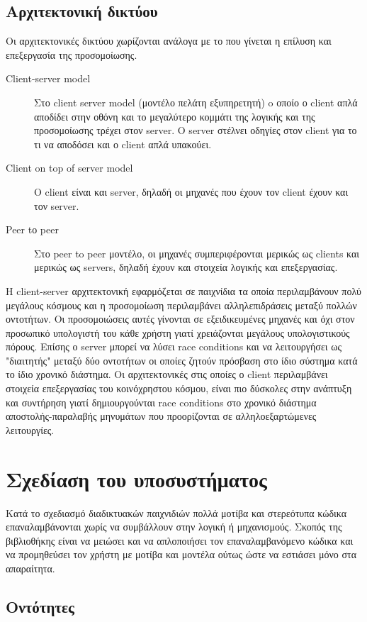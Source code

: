 		\subsection{Αρχιτεκτονική δικτύου}
			Οι αρχιτεκτονικές δικτύου χωρίζονται ανάλογα με το που γίνεται η επίλυση και επεξεργασία της προσομοίωσης.  
		\begin{description}	
			\item [Client-server model] Στο client server model (μοντέλο πελάτη εξυπηρετητή) o οποίο ο client απλά αποδίδει στην οθόνη και το μεγαλύτερο κομμάτι της λογικής και της προσομοίωσης τρέχει στον server. Ο server στέλνει οδηγίες στον client για το τι να αποδόσει και ο client απλά υπακούει.
			\item [Client on top of server model] Ο client είναι και server, δηλαδή οι μηχανές που έχουν τον client έχουν και τον server.
			\item [Peer tο peer] Στο peer to peer μοντέλο, οι μηχανές συμπεριφέρονται μερικώς ως clients και μερικώς ως servers, δηλαδή έχουν και στοιχεία λογικής και επεξεργασίας.
		\end{description}
			Η client-server αρχιτεκτονική εφαρμόζεται σε παιχνίδια τα οποία περιλαμβάνουν πολύ μεγάλους κόσμους και η προσομοίωση περιλαμβάνει αλληλεπιδράσεις μεταξύ πολλών οντοτήτων. Οι προσομοιώσεις αυτές γίνονται σε εξειδικευμένες μηχανές και όχι στον προσωπικό υπολογιστή του κάθε χρήστη γιατί χρειάζονται μεγάλους υπολογιστικούς πόρους. Επίσης ο server μπορεί να λύσει race conditions και να λειτουργήσει ως "διαιτητής" μεταξύ δύο οντοτήτων οι οποίες ζητούν πρόσβαση στο ίδιο σύστημα κατά το ίδιο χρονικό διάστημα. Οι αρχιτεκτονικές στις οποίες ο client περιλαμβάνει στοιχεία επεξεργασίας του κοινόχρηστου κόσμου, είναι πιο δύσκολες στην ανάπτυξη και συντήρηση γιατί δημιουργούνται race conditions στο χρονικό διάστημα αποστολής-παραλαβής μηνυμάτων που προορίζονται σε αλληλοεξαρτώμενες λειτουργίες.
			
		\section{Σχεδίαση του υποσυστήματος}
		Κατά το σχεδιασμό διαδικτυακών παιχνιδιών πολλά μοτίβα και στερεότυπα κώδικα επαναλαμβάνονται χωρίς να συμβάλλουν στην λογική ή μηχανισμούς. Σκοπός της βιβλιοθήκης είναι να μειώσει και να απλοποιήσει τον επαναλαμβανόμενο κώδικα και να προμηθεύσει τον χρήστη με μοτίβα και μοντέλα ούτως ώστε να εστιάσει μόνο στα απαραίτητα.
		
		\subsection{Οντότητες}
